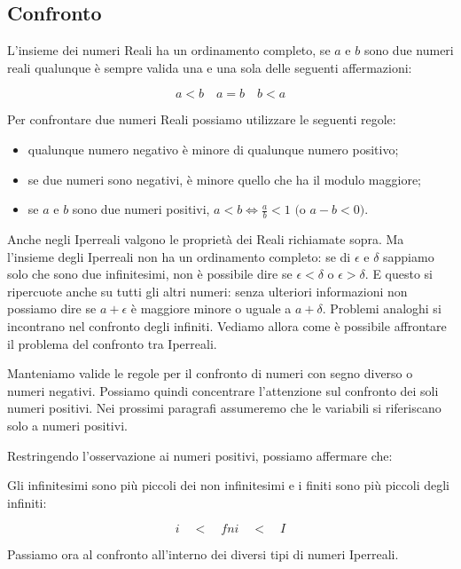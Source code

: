 \subsection{Confronto}
\label{subsec:insnum_confronto}

L'insieme dei numeri Reali ha un ordinamento completo, se $a$ e $b$ sono due 
numeri reali qualunque è sempre valida una e una sola delle seguenti 
affermazioni:

\[a<b \quad a=b \quad b<a\]

Per confrontare due numeri Reali possiamo utilizzare le seguenti regole:

\begin{itemize} [noitemsep]
 \item qualunque numero negativo è minore di qualunque numero positivo;
 \item se due numeri sono negativi, è minore quello che ha il modulo maggiore;
 \item se $a$ e $b$ sono due numeri positivi, 
 $a<b \Leftrightarrow \frac{a}{b}<1 \text{ (o } a-b<0 \text{)}$.
\end{itemize}

Anche negli Iperreali valgono le proprietà dei Reali richiamate sopra. 
Ma l'insieme degli Iperreali non ha un ordinamento completo:
se di $\epsilon$ e $\delta$ sappiamo solo che sono due infinitesimi,
non è possibile dire se $\epsilon < \delta$ o $\epsilon > \delta$.
E questo si ripercuote anche su tutti gli altri numeri: senza ulteriori 
informazioni non possiamo dire se $a+\epsilon$ è maggiore minore o uguale 
a $a+\delta$. 
Problemi analoghi si incontrano nel confronto degli infiniti.
Vediamo allora come è possibile affrontare il problema del confronto tra 
Iperreali.

\begin{osservazione}
Manteniamo valide le regole per il confronto di numeri con segno diverso o numeri 
negativi. Possiamo quindi concentrare l'attenzione sul confronto dei soli numeri positivi.
Nei prossimi paragrafi assumeremo che le variabili si riferiscano solo a numeri 
positivi.
\end{osservazione}

Restringendo l'osservazione ai numeri positivi, possiamo affermare che:

Gli infinitesimi sono più piccoli dei non 
infinitesimi e i finiti sono più piccoli degli infiniti:

\[i \quad < \quad fni \quad < \quad I\]

Passiamo ora al confronto all'interno dei diversi tipi di numeri Iperreali.

